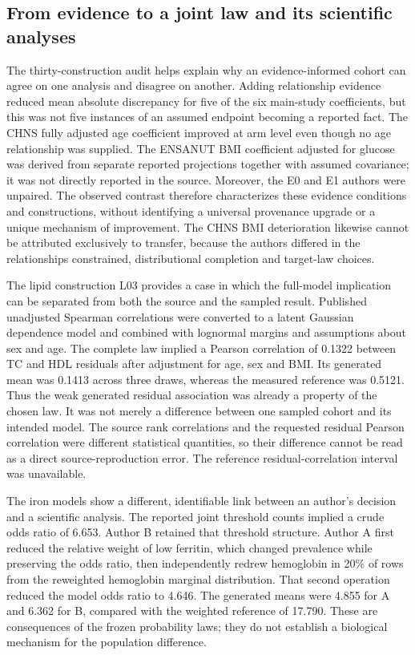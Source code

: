 \documentclass[11pt,letterpaper]{article}
\begin{document}
\endgroup

\subsection{From evidence to a joint law and its scientific analyses}

The thirty-construction audit helps explain why an evidence-informed cohort can agree on one analysis and disagree on another. Adding relationship evidence reduced mean absolute discrepancy for five of the six main-study coefficients, but this was not five instances of an assumed endpoint becoming a reported fact. The CHNS fully adjusted age coefficient improved at arm level even though no age relationship was supplied. The ENSANUT BMI coefficient adjusted for glucose was derived from separate reported projections together with assumed covariance; it was not directly reported in the source. Moreover, the E0 and E1 authors were unpaired. The observed contrast therefore characterizes these evidence conditions and constructions, without identifying a universal provenance upgrade or a unique mechanism of improvement. The CHNS BMI deterioration likewise cannot be attributed exclusively to transfer, because the authors differed in the relationships constrained, distributional completion and target-law choices.


The lipid construction L03 provides a case in which the full-model implication can be separated from both the source and the sampled result. Published unadjusted Spearman correlations were converted to a latent Gaussian dependence model and combined with lognormal margins and assumptions about sex and age. The complete law implied a Pearson correlation of 0.1322 between TC and HDL residuals after adjustment for age, sex and BMI. Its generated mean was 0.1413 across three draws, whereas the measured reference was 0.5121. Thus the weak generated residual association was already a property of the chosen law. It was not merely a difference between one sampled cohort and its intended model. The source rank correlations and the requested residual Pearson correlation were different statistical quantities, so their difference cannot be read as a direct source-reproduction error. The reference residual-correlation interval was unavailable.


The iron models show a different, identifiable link between an author's decision and a scientific analysis. The reported joint threshold counts implied a crude odds ratio of 6.653. Author B retained that threshold structure. Author A first reduced the relative weight of low ferritin, which changed prevalence while preserving the odds ratio, then independently redrew hemoglobin in 20\% of rows from the reweighted hemoglobin marginal distribution. That second operation reduced the model odds ratio to 4.646. The generated means were 4.855 for A and 6.362 for B, compared with the weighted reference of 17.790. These are consequences of the frozen probability laws; they do not establish a biological mechanism for the population difference.
\end{document}
